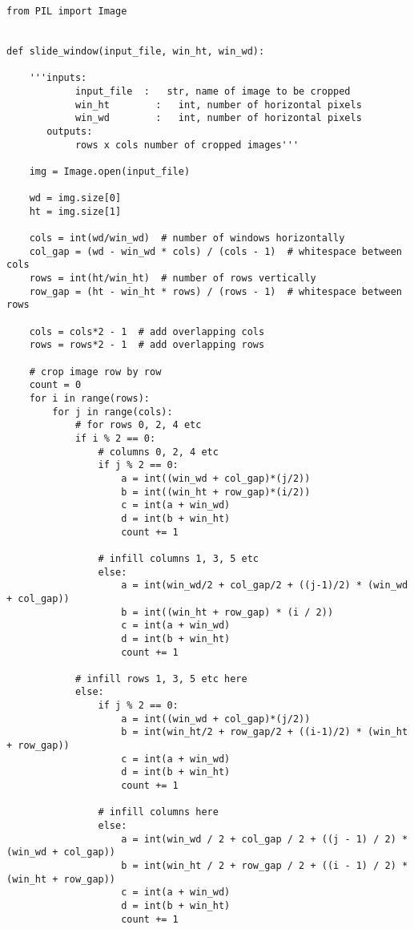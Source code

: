 \begin{lstlisting}
from PIL import Image


def slide_window(input_file, win_ht, win_wd):

    '''inputs:
            input_file  :   str, name of image to be cropped
            win_ht        :   int, number of horizontal pixels
            win_wd        :   int, number of horizontal pixels
       outputs:
            rows x cols number of cropped images'''

    img = Image.open(input_file)

    wd = img.size[0]
    ht = img.size[1]

    cols = int(wd/win_wd)  # number of windows horizontally
    col_gap = (wd - win_wd * cols) / (cols - 1)  # whitespace between cols
    rows = int(ht/win_ht)  # number of rows vertically
    row_gap = (ht - win_ht * rows) / (rows - 1)  # whitespace between rows

    cols = cols*2 - 1  # add overlapping cols
    rows = rows*2 - 1  # add overlapping rows

    # crop image row by row
    count = 0
    for i in range(rows):
        for j in range(cols):
            # for rows 0, 2, 4 etc
            if i % 2 == 0:
                # columns 0, 2, 4 etc
                if j % 2 == 0:
                    a = int((win_wd + col_gap)*(j/2))
                    b = int((win_ht + row_gap)*(i/2))
                    c = int(a + win_wd)
                    d = int(b + win_ht)
                    count += 1

                # infill columns 1, 3, 5 etc
                else:
                    a = int(win_wd/2 + col_gap/2 + ((j-1)/2) * (win_wd + col_gap))
                    b = int((win_ht + row_gap) * (i / 2))
                    c = int(a + win_wd)
                    d = int(b + win_ht)
                    count += 1

            # infill rows 1, 3, 5 etc here
            else:
                if j % 2 == 0:
                    a = int((win_wd + col_gap)*(j/2))
                    b = int(win_ht/2 + row_gap/2 + ((i-1)/2) * (win_ht + row_gap))
                    c = int(a + win_wd)
                    d = int(b + win_ht)
                    count += 1

                # infill columns here
                else:
                    a = int(win_wd / 2 + col_gap / 2 + ((j - 1) / 2) * (win_wd + col_gap))
                    b = int(win_ht / 2 + row_gap / 2 + ((i - 1) / 2) * (win_ht + row_gap))
                    c = int(a + win_wd)
                    d = int(b + win_ht)
                    count += 1


\end{lstlisting}
